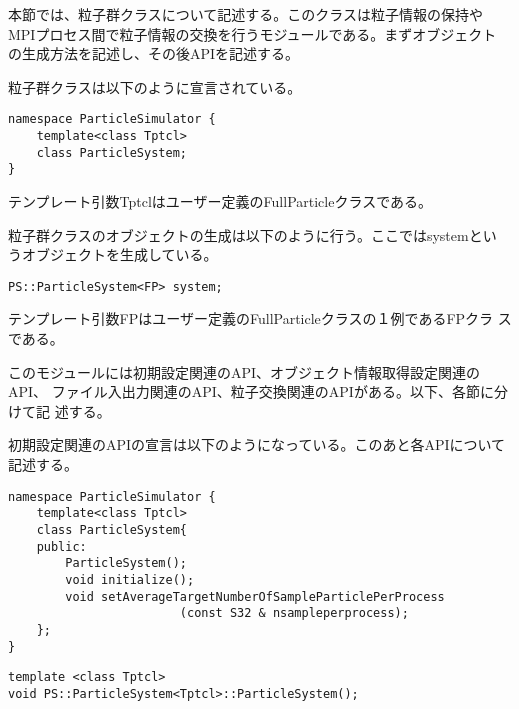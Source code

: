 本節では、粒子群クラスについて記述する。このクラスは粒子情報の保持や
MPIプロセス間で粒子情報の交換を行うモジュールである。まずオブジェクト
の生成方法を記述し、その後APIを記述する。


粒子群クラスは以下のように宣言されている。
\begin{lstlisting}[caption=ParticleSystem0]
namespace ParticleSimulator {
    template<class Tptcl>
    class ParticleSystem;
}
\end{lstlisting}
テンプレート引数Tptclはユーザー定義のFullParticleクラスである。

粒子群クラスのオブジェクトの生成は以下のように行う。ここではsystemとい
うオブジェクトを生成している。
\begin{screen}
\begin{verbatim}
PS::ParticleSystem<FP> system;
\end{verbatim}
\end{screen}
テンプレート引数FPはユーザー定義のFullParticleクラスの１例であるFPクラ
スである。


このモジュールには初期設定関連のAPI、オブジェクト情報取得設定関連のAPI、
ファイル入出力関連のAPI、粒子交換関連のAPIがある。以下、各節に分けて記
述する。


初期設定関連のAPIの宣言は以下のようになっている。このあと各APIについて
記述する。
\begin{lstlisting}[caption=ParticleSystem1]
namespace ParticleSimulator {
    template<class Tptcl>
    class ParticleSystem{
    public:
        ParticleSystem();
        void initialize();
        void setAverageTargetNumberOfSampleParticlePerProcess
                        (const S32 & nsampleperprocess);
    };
}
\end{lstlisting}



\begin{screen}
\begin{verbatim}
template <class Tptcl>
void PS::ParticleSystem<Tptcl>::ParticleSystem();
\end{verbatim}
\end{screen}

